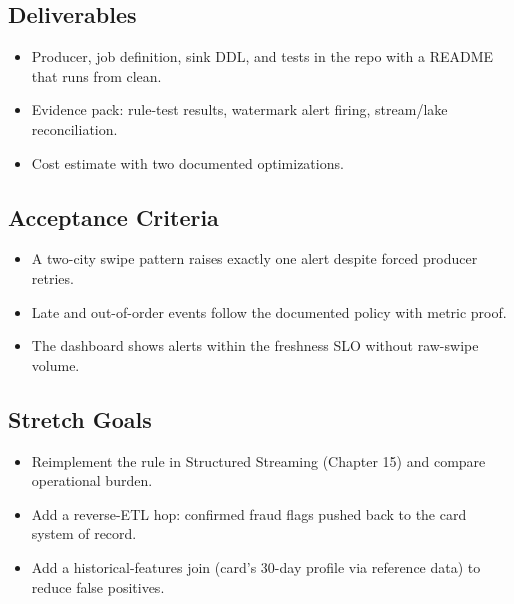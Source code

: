 \subsection*{Deliverables}
\begin{itemize}
    \item Producer, job definition, sink DDL, and tests in the repo with a README that runs from clean.
    \item Evidence pack: rule-test results, watermark alert firing, stream/lake reconciliation.
    \item Cost estimate with two documented optimizations.
\end{itemize}

\subsection*{Acceptance Criteria}
\begin{itemize}
    \item A two-city swipe pattern raises exactly one alert despite forced producer retries.
    \item Late and out-of-order events follow the documented policy with metric proof.
    \item The dashboard shows alerts within the freshness SLO without raw-swipe volume.
\end{itemize}

\subsection*{Stretch Goals}
\begin{itemize}
    \item Reimplement the rule in Structured Streaming (Chapter 15) and compare operational burden.
    \item Add a reverse-ETL hop: confirmed fraud flags pushed back to the card system of record.
    \item Add a historical-features join (card's 30-day profile via reference data) to reduce false positives.
\end{itemize}
